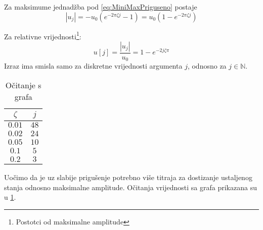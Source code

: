 Za maksimume jednadžba pod \eqref{eq:MiniMaxPriguseno} postaje
\begin{equation}
    |u_j| = -u_0(e^{-2\pi\zeta j} -1) = u_0(1-e^{-2\pi\zeta j})
\end{equation}

Za relativne vrijednosti\footnote{Postotci od maksimalne amplitude}:
\begin{equation}
    u[j] = \frac{|u_j|}{u_0}=1-e^{-2j\zeta\pi}
\end{equation}
Izraz ima smisla samo za diskretne vrijednosti argumenta $j$, odnosno za $j \in
\mathbb{N}$.

\par
\begin{table}[H]
    \begin{tabular}{c | c}
       \hline
        $\zeta$ & $j$\\
        \hline
        $0.01$ & $48$\\
        \hline
        $0.02$ & $24$\\
        \hline
        $0.05$ & $10$\\
        \hline
        $0.1$ & $5$\\
        \hline
        $0.2$ & $3$\\
        \hline
    \end{tabular}
    \caption{Očitanje s grafa}
    \label{table:prirast-rezonanca-priguseno}
\end{table}

Uočimo da je uz slabije prigušenje potrebno više titraja za dostizanje ustaljenog
stanja odnosno maksimalne amplitude. Očitanja vrijednosti sa grafa prikazana su u
\ref{table:prirast-rezonanca-priguseno}.


